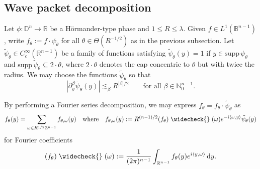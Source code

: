 \documentclass[reqno]{amsart}
\numberwithin{equation}{section}
\newcommand{\B}{\mathbb{B}}
\newcommand{\D}{\mathbb{D}}
\newcommand{\N}{\mathbb{N}}
\newcommand{\R}{\mathbb{R}}
\newcommand{\Z}{\mathbb{Z}}
\newcommand{\ud}{\mathrm{d}}
\def\inn#1#2{\langle#1,#2\rangle}
\theoremstyle{plain}
\theoremstyle{definition}
\newcommand{\supp}{\mathrm{supp}\,}
\begin{document}
\subsection{Wave packet decomposition}%
Let $\phi \colon \D^n \to \R$ be a H\"ormander-type phase and $1 \leq R \leq \lambda$. Given $f \in L^1(\B^{n-1})$, write $f_{\theta} := f \cdot \psi_{\theta}$ for all $\theta \in \Theta(R^{-1/2})$ as in the previous subsection. Let $\tilde{\psi}_{\theta} \in C^{\infty}_c(\R^{n-1})$ be a family of functions satisfying $\tilde{\psi}_{\theta}(y) = 1$ if $y \in \supp \psi_{\theta}$ and $\supp \tilde{\psi}_{\theta} \subseteq 2 \cdot \theta$, where $2 \cdot \theta$ denotes the cap concentric to $\theta$ but with twice the radius. We may choose the functions $\tilde{\psi}_{\theta}$ so that 
\begin{equation*}
    |\partial_y^{\beta} \tilde{\psi}_{\theta}(y)| \lesssim_{\beta} R^{|\beta|/2} \qquad \textrm{for all $\beta \in \N_0^{n-1}$.}
\end{equation*}

By performing a Fourier series decomposition, we may express $f_{\theta} = f_{\theta} \cdot \tilde{\psi}_{\theta}$ as
\begin{equation*}
    f_{\theta}(y) = \sum_{\omega \in R^{1/2}\Z^{n-1}} f_{\theta, \omega}(y) \quad \textrm{where} \quad f_{\theta,\omega}(y) := R^{(n-1)/2} (f_{\theta})\;\widecheck{}\;(\omega)e^{-i\inn{\omega}{y}}\tilde{\psi}_{\theta}(y)
\end{equation*}
for Fourier coefficients 
\begin{equation*}
    (f_{\theta})\;\widecheck{}\;(\omega) := \frac{1}{(2\pi)^{n-1}} \int_{\R^{n-1}} f_{\theta}(y) e^{i\inn{y}{\omega}}\,\ud y. 
\end{equation*}
\end{document}
